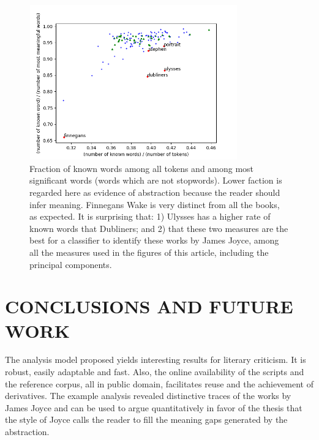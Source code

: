 \documentclass[12pt,fleqn]{article}
\begin{document}
\begin{figure}[!htbp] %
\vspace{-2pt}
\begin{center}
\includegraphics[height=6.7cm,width=9cm]{figs/abst2}%
    \caption{Fraction of known words among all tokens and among most significant words (words which are not stopwords).
    Lower faction is regarded here as evidence of abstraction because the reader should infer meaning.
    Finnegans Wake is very distinct from all the books, as expected.
    It is surprising that: 1) Ulysses has a higher rate of known words that Dubliners;
    and 2) that these two measures are the best for a classifier to identify these works by James Joyce, among all the measures used in the figures of this article, including the principal components.}
\label{fig:abst2}%
\end{center}
\end{figure}

\section{CONCLUSIONS AND FUTURE WORK}\label{sec:conc}
The analysis model proposed yields interesting results for literary criticism.
It is robust, easily adaptable and fast.
Also, the online availability of the scripts and the reference corpus,
all in public domain, facilitates reuse and the achievement of derivatives.
The example analysis
revealed distinctive traces of the works by James Joyce and can be used to argue quantitatively
in favor of the thesis that the style of Joyce calls the reader to fill the
meaning gaps generated by the abstraction.
\end{document}
